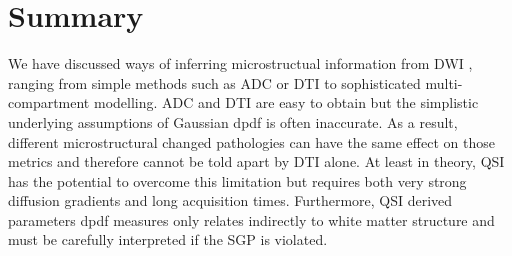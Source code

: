 % 
% 
%     
% 
% 
 
\section{Summary}
We have discussed ways of inferring microstructual information from  {\gls{DWI}} , ranging from simple methods such as \gls{ADC} or \gls{DTI} to sophisticated multi-compartment modelling. \gls{ADC} and \gls{DTI} are easy to obtain but the simplistic underlying assumptions of Gaussian  {\gls{dpdf}} is often inaccurate. As a result, different microstructural changed pathologies can have the same effect on those metrics and therefore cannot be told apart by \gls{DTI} alone. At least in theory, \gls{QSI} has the potential to overcome this limitation but requires both very strong diffusion gradients and long acquisition times. Furthermore, \gls{QSI} derived parameters  {\gls{dpdf}} measures only relates indirectly to white matter structure and must be carefully interpreted if the SGP is violated.



